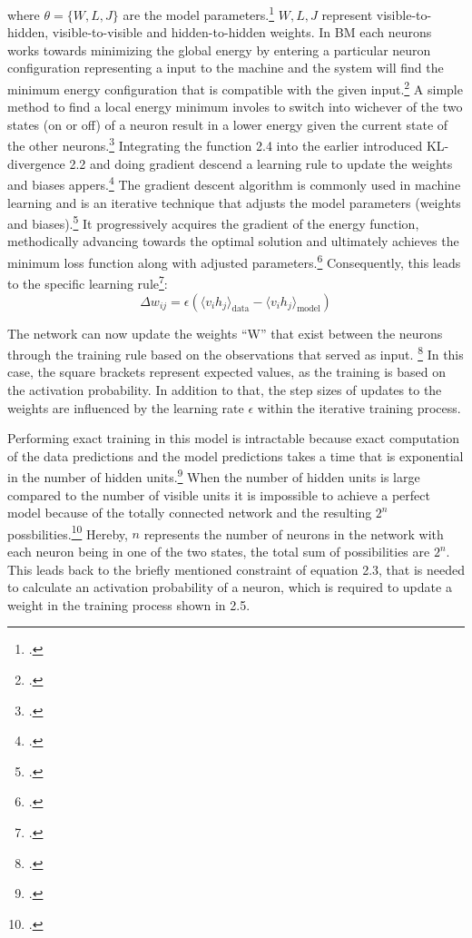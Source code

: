 where \( \theta = \{W, L, J\} \) are the model parameters.\footcite[cf.][448]{salakhutdinovDeepBoltzmannMachines2009}
\( W, L, J \) represent visible-to-hidden, visible-to-visible and hidden-to-hidden weights.
In \ac{BM} each neurons works towards minimizing the global energy by 
entering a particular neuron configuration representing a input to the machine and the system will find the minimum energy configuration that is compatible with the given input.\footcite[cf.][150]{ackleyLearningAlgorithmBoltzmann1985}
A simple method to find a local energy minimum involes to switch into wichever of the two states (on or off) of a neuron result in a lower energy given the current state of the other neurons.\footcite[cf.][110]{fahlmanMassivelyParallelArchitectures1983}    
Integrating the function 2.4 into the earlier introduced KL-divergence 2.2 and doing gradient descend a learning rule to update the weights and biases appers.\footcite[cf.][5]{hintonPracticalGuideTraining2012}
The gradient descent algorithm is commonly used in machine learning and is an iterative technique that adjusts the model parameters (weights and biases).\footcite[cf.][11]{wangResearchApplicationGradient2021}
It progressively acquires the gradient of the energy function, methodically advancing towards the optimal solution and ultimately achieves the minimum loss function along with adjusted parameters.\footcite[cf.][11]{wangResearchApplicationGradient2021}
Consequently, this leads to the specific learning rule\footcite[cf.][5]{hintonPracticalGuideTraining2012}:
\begin{equation}
    \Delta w_{ij} = \epsilon ( \langle v_i h_j \rangle_{\text{data}} - \langle v_i h_j \rangle_{\text{model}} )
\end{equation}

The network can now update the weights ``W'' that exist between the neurons through the training rule based on the observations that served as input. \footcite[cf.][1-2]{barraEquivalenceHopfieldNetworks2012}
In this case, the square brackets represent expected values, as the training is based on the activation probability.
In addition to that, the step sizes of updates to the weights are influenced by the learning rate \(\epsilon\) within the iterative training process.

Performing exact training in this model is intractable because exact computation of the data predictions and the model predictions takes a time that is exponential in the number of hidden units.\footcite[cf.][449]{salakhutdinovDeepBoltzmannMachines2009}
When the number of hidden units is large compared to the number of visible units it is impossible to achieve a perfect model because of the totally connected network and the resulting \( 2^n \) possbilities.\footcite[cf.][154]{ackleyLearningAlgorithmBoltzmann1985}
Hereby, \( n\) represents the number of neurons in the network with each neuron being in one of the two states, the total sum of possibilities are \( 2^n \).
This leads back to the briefly mentioned constraint of equation 2.3, that is needed to calculate an activation probability of a neuron, which is required to update a weight in the training process shown in 2.5.

